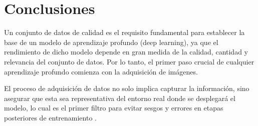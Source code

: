 
\chapter{Conclusiones}
Un conjunto de datos de calidad es el requisito fundamental para establecer la base de un modelo de aprendizaje profundo (deep learning), 
ya que el rendimiento de dicho modelo depende en gran medida de la calidad, cantidad y relevancia del conjunto de datos. Por lo tanto,
el primer paso crucial de cualquier aprendizaje profundo comienza con la adquisición de imágenes.

El proceso de adquisición de datos no solo implica capturar la información, sino asegurar que esta sea representativa del entorno real donde 
se desplegará el modelo, lo cual es el primer filtro para evitar sesgos y errores en etapas posteriores de entrenamiento \cite{Khan2023}.